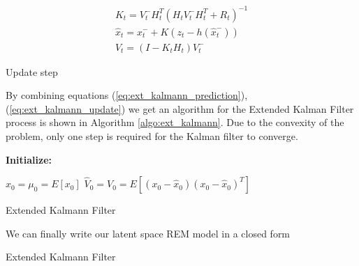 \documentclass[mscthesis]{usiinfthesis}
\begin{document}
\begin{eqfloat}[H]
\begin{equation}
\begin{array}{l}
K_t = V_t^- H^T_t (H_t V_t^- H^T_t + R_t)^{-1} \\
\hat{x}_t = x_t^- + K (z_t - h(\hat{x}_t^-)) \\
V_t = (I-K_t H_t)V_t^-
\end{array}
\end{equation}
\caption{Update step}
\label{eq:ext_kalmann_update}
\end{eqfloat}

By combining equations (\ref{eq:ext_kalmann_prediction}), (\ref{eq:ext_kalmann_update}) we get an algorithm for the Extended Kalman Filter process is shown in Algorithm \ref{algo:ext_kalmann}. Due to the convexity of the problem, only one step is required for the Kalman filter to converge.

\begin{algorithm}[H]
\textbf{Initialize: }
\begin{substeps}
$\hat{x}_0 = \mu_0 = E[x_0]$ \;
$\hat{V}_0 = V_0 = E[(x_0-\hat{x}_0)(x_0-\hat{x}_0)^T]$  \;
\end{substeps}
  \caption{Extended Kalmann Filter}
  \label{algo:ext_kalmann}
\end{algorithm}


We can finally write our latent space REM model in a closed form

\begin{algorithm}[H]
\caption{Extended Kalmann Filter}
\label{algo:ext_kalmann}
\end{algorithm}
\end{document}
